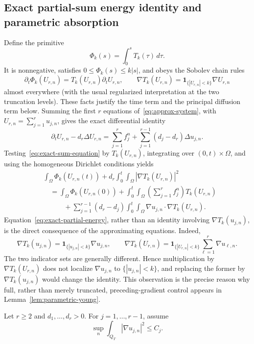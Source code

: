 \subsection{Exact partial-sum energy identity and parametric absorption}

Define the primitive
\[
 \Phi_k(s)=\int_0^sT_k(\tau)\,d\tau.
\]
It is nonnegative, satisfies $0\le\Phi_k(s)\le k|s|$, and obeys the Sobolev chain rules
\[
 \partial_t\Phi_k(U_{r,n})=T_k(U_{r,n})\partial_tU_{r,n},\qquad
 \nabla T_k(U_{r,n})=\mathbf 1_{\{|U_{r,n}|<k\}}\nabla U_{r,n}
\]
almost everywhere (with the usual regularized interpretation at the two truncation levels). These facts justify the time term and the principal diffusion term below.
Summing the first $r$ equations of~\eqref{eq:approx-system}, with $U_{r,n}=\sum_{j=1}^r u_{j,n}$, gives the exact differential identity
\begin{equation}
 \partial_tU_{r,n}-d_r\Delta U_{r,n}
 =\sum_{j=1}^r f_j^n
  +\sum_{j=1}^{r-1}(d_j-d_r)\Delta u_{j,n}.
 \label{eq:exact-sum-equation}
\end{equation}
Testing~\eqref{eq:exact-sum-equation} by $T_k(U_{r,n})$, integrating over $(0,t)\times\Omega$, and using the homogeneous Dirichlet conditions yields
\begin{align}
 &\int_\Omega\Phi_k(U_{r,n}(t))
 +d_r\int_0^t\!\!\int_\Omega|\nabla T_k(U_{r,n})|^2 \nonumber\\
 &\quad=\int_\Omega\Phi_k(U_{r,n}(0))
 +\int_0^t\!\!\int_\Omega\left(\sum_{j=1}^rf_j^n\right)T_k(U_{r,n}) \nonumber\\
 &\qquad\quad+\sum_{j=1}^{r-1}(d_r-d_j)
 \int_0^t\!\!\int_\Omega\nabla u_{j,n}\cdot\nabla T_k(U_{r,n}).
 \label{eq:exact-partial-energy}
\end{align}
Equation~\eqref{eq:exact-partial-energy}, rather than an identity involving $\nabla T_k(u_{j,n})$, is the direct consequence of the approximating equations. Indeed,
\[
 \nabla T_k(u_{j,n})=\mathbf 1_{\{|u_{j,n}|<k\}}\nabla u_{j,n},\qquad
 \nabla T_k(U_{r,n})=\mathbf 1_{\{|U_{r,n}|<k\}}\sum_{\ell=1}^r\nabla u_{\ell,n}.
\]
The two indicator sets are generally different. Hence multiplication by $\nabla T_k(U_{r,n})$ does not localize $\nabla u_{j,n}$ to $\{|u_{j,n}|<k\}$, and replacing the former by $\nabla T_k(u_{j,n})$ would change the identity. This observation is the precise reason why full, rather than merely truncated, preceding-gradient control appears in Lemma~\ref{lem:parametric-young}.

\begin{assumption}\label{ass:previous-full-gradient}
Let $r\ge2$ and $d_1,\ldots,d_r>0$. For $j=1,\ldots,r-1$, assume
\begin{equation}
 \sup_n\int_{Q_T}|\nabla u_{j,n}|^2\le C_j.
 \label{eq:previous-full-gradient}
\end{equation}
\end{assumption}


